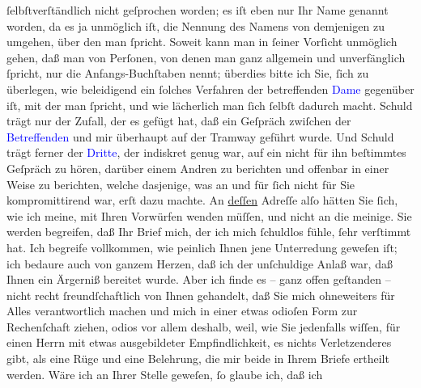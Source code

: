                ſelbſtverſtändlich nicht geſprochen worden; es iſt eben nur Ihr Name genannt worden,
               da es ja unmöglich iſt, die Nennung des Namens von demjenigen zu umgehen, über den
               man ſpricht. Soweit kann man in ſeiner Vorſicht unmöglich gehen, daß man von
               Perſonen, von denen man ganz {\pb}allgemein und unverfänglich ſpricht, nur die Anfangs-Buchſtaben nennt; überdies
               bitte ich Sie, ſich zu überlegen, wie beleidigend ein ſolches Verfahren der
               betreffenden \textcolor{blue}{Dame}{} gegenüber
               iſt, mit der man ſpricht, und wie lächerlich man ſich ſelbſt dadurch macht. Schuld
               trägt nur der Zufall, der es gefügt hat, daß ein Geſpräch zwiſchen der \textcolor{blue}{Betreffenden}{} und mir
               überhaupt auf der Tramway geführt wurde. Und Schuld trägt ferner der \textcolor{blue}{Dritte}{}, der indiskret genug
               war, auf ein nicht für ihn beſtimmtes Geſpräch zu hören, darüber einem Andren zu
               berichten und offenbar in einer Weise zu berichten, welche dasjenige, was an  und für ſich nicht \introOben{}für Sie\introOben{}
               kompromittirend war, erſt dazu machte. An \uline{deſſen}
               Adreſſe alſo hätten Sie ſich, wie ich meine, mit Ihren Vorwürfen wenden müſſen, und
               nicht an die meinige.\pend
           \pstart
           Sie werden begreifen, daß Ihr Brief mich, der ich mich ſchuldlos fühle, ſehr
               verſtimmt hat. Ich begreife vollkommen, wie peinlich Ihnen jene Unterredung geweſen
               iſt; ich bedaure auch von ganzem Herzen, daß ich der unſchuldige Anlaß war, daß Ihnen
               ein Ärgerniß bereitet wurde. Aber ich finde es – ganz offen geſtanden – {\pb}nicht recht ſreundſchaftlich von
               Ihnen gehandelt, daß Sie mich ohneweiters für Alles verantwortlich machen und mich in
               einer etwas odioſen Form zur Rechenſchaft ziehen, odios vor allem deshalb, weil, wie
               Sie jedenfalls wiſſen, für einen Herrn mit etwas ausgebildeter Empfindlichkeit, es
               nichts Verletzenderes gibt, als eine Rüge und eine Belehrung, die mir beide in Ihrem
               Briefe ertheilt werden. Wäre ich an Ihrer Stelle geweſen, ſo glaube ich, daß ich
